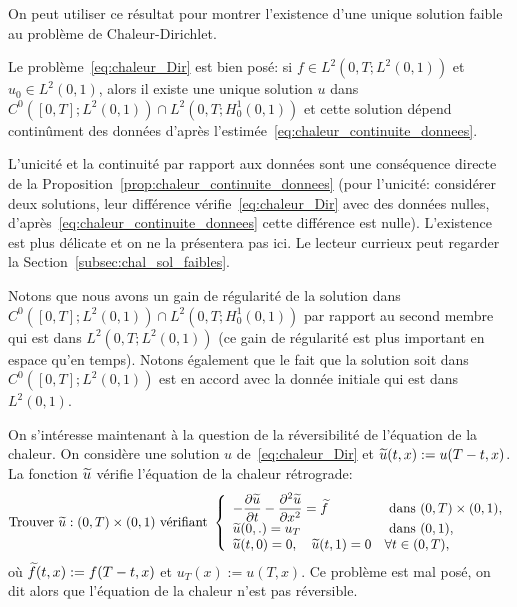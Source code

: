 \documentclass[12pt,a4paper,twoside]{article}
\begin{document}
On peut utiliser ce r\'esultat pour montrer l'existence d'une unique solution faible
au probl\`eme de Chaleur-Dirichlet.


\begin{proposition}
  \label{prop:chal_sol_faibles}
  Le probl\`eme~\eqref{eq:chaleur_Dir} est bien pos\'e:
  si $f \in L^2(0,T;L^2(0,1))$ et $u_0 \in L^2(0,1)$,
  alors il existe une unique solution $u$
  dans $C^0([0,T];L^2(0,1)) \cap L^2(0,T;H_0^1(0,1))$
  et cette solution d\'epend contin\^ument des donn\'ees d'apr\`es
  l'estim\'ee~\eqref{eq:chaleur_continuite_donnees}.
\end{proposition}
L'unicit\'e et la continuit\'e par rapport aux donn\'ees sont une cons\'equence directe
de la Proposition~\ref{prop:chaleur_continuite_donnees}
(pour l'unicit\'e: consid\'erer deux solutions, leur diff\'erence v\'erifie~\eqref{eq:chaleur_Dir}
avec des donn\'ees nulles, d'apr\`es~\eqref{eq:chaleur_continuite_donnees}
cette diff\'erence est nulle).
L'existence est plus d\'elicate et on ne la pr\'esentera pas ici.
Le lecteur currieux peut regarder la Section~\ref{subsec:chal_sol_faibles}.

Notons que nous avons un gain de r\'egularit\'e de la solution
dans $C^0([0,T];L^2(0,1)) \cap L^2(0,T;H_0^1(0,1))$
par rapport au second membre qui est dans $L^2(0,T;L^2(0,1))$
(ce gain de r\'egularit\'e est plus important en espace qu'en temps).
Notons \'egalement que le fait que la solution soit dans $C^0([0,T];L^2(0,1))$
est en accord avec la donn\'ee initiale qui est dans $L^2(0,1)$.


On s'int\'eresse maintenant \`a la question de la r\'eversibilit\'e de l'\'equation
de la chaleur. On consid\`ere une solution $u$ de~\eqref{eq:chaleur_Dir}
et $\widetilde{u}(t,x) := u(T-t,x)$.
La fonction $\widetilde{u}$ v\'erifie l'\'equation de la chaleur r\'etrograde:
\begin{equation}
  \label{eq:chaleur_retro}
  \text{Trouver $\widetilde{u} : (0,T) \times (0,1)$ v\'erifiant }
  \left\{
    \begin{array}{l l}
      -\dfrac{\partial \widetilde{u}}{\partial t} - \dfrac{\partial^2 \widetilde{u}}{\partial x^2} = \widetilde{f} 
      &\text{ dans } (0,T) \times (0,1) ,
      \\
      \widetilde{u}(0,.) = u_T 
      & \text{ dans } (0,1) ,
      \\
      \widetilde{u}(t,0) = 0 , \quad \widetilde{u}(t,1) = 0 & \forall t \in (0,T) ,
    \end{array}
  \right.
\end{equation}
o\`u $\widetilde{f}(t,x) := f(T-t,x)$ et $u_T(x) := u(T,x)$.
Ce probl\`eme est mal pos\'e, on dit alors que l'\'equation de la chaleur n'est pas r\'eversible.
\end{document}
